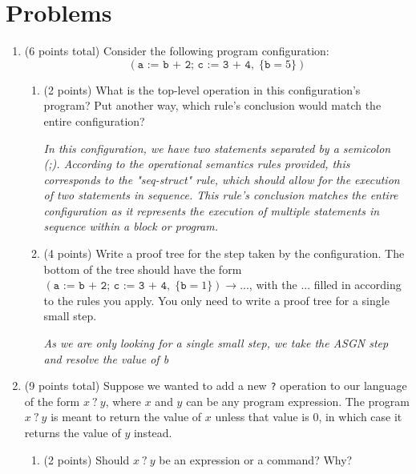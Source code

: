 \documentclass[11pt]{article}
\begin{document}
\section{Problems}

\begin{enumerate}
\item (6 points total) Consider the following program configuration: \[(\texttt{a := b + 2; c := 3 + 4},\; \{\texttt{b} = 5\})\]

\begin{enumerate}
\item (2 points) What is the top-level operation in this configuration's program? Put another way, which rule's conclusion would match the entire configuration?


\textit{In this configuration, we have two statements separated by a semicolon (;). According to the operational semantics rules provided, this corresponds to the "seq-struct" rule, which should allow for the execution of two statements in sequence. This rule's conclusion matches the entire configuration as it represents the execution of multiple statements in sequence within a block or program.
}

\vspace{.5in}

\item (4 points) Write a proof tree for the step taken by the configuration. The bottom of the tree should have the form $(\texttt{a := b + 2; c := 3 + 4},\; \{\texttt{b} = 1\}) \rightarrow ...$, with the $...$ filled in according to the rules you apply. You only need to write a proof tree for a single small step.


\textit{
As we are only looking for a single small step, we take the ASGN step and resolve the value of b
}
\begin{center}
\end{center}

\end{enumerate}
\newpage

\item (9 points total) Suppose we wanted to add a new \texttt{?} operation to our language of the form $x\ \texttt{?}\ y$, where $x$ and $y$ can be any program expression. The program $x\ \texttt{?}\ y$ is meant to return the value of $x$ unless that value is 0, in which case it returns the value of $y$ instead.

\begin{enumerate}
\item (2 points) Should $x\ \texttt{?}\ y$ be an expression or a command? Why?


\end{enumerate}
\end{enumerate}
\end{document}
